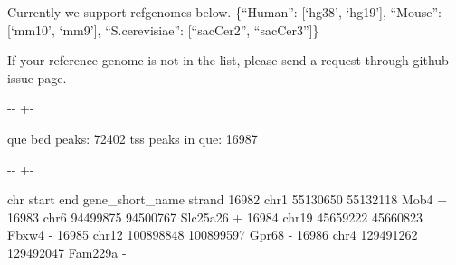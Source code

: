 \documentclass[letterpaper,10pt,english]{sphinxmanual}
\newlength\nbsphinxcodecellspacing
\begin{document}
Currently we support refgenomes below. \{“Human”: {[}‘hg38’, ‘hg19’{]}, “Mouse”: {[}‘mm10’, ‘mm9’{]}, “S.cerevisiae”: {[}“sacCer2”, “sacCer3”{]}\}

If your reference genome is not in the list, please send a request through github issue page.

{
\begin{sphinxVerbatim}[commandchars=\\\{\}]
\llap{\color{nbsphinxin}[5]:\,\hspace{\fboxrule}\hspace{\fboxsep}}
     


\end{sphinxVerbatim}
}

{

\kern-\sphinxverbatimsmallskipamount\kern-\baselineskip
\kern+\FrameHeightAdjust\kern-\fboxrule
\vspace{\nbsphinxcodecellspacing}

\begin{sphinxVerbatim}[commandchars=\\\{\}]
que bed peaks: 72402
tss peaks in que: 16987
\end{sphinxVerbatim}
}

{

\kern-\sphinxverbatimsmallskipamount\kern-\baselineskip
\kern+\FrameHeightAdjust\kern-\fboxrule
\vspace{\nbsphinxcodecellspacing}

\begin{sphinxVerbatim}[commandchars=\\\{\}]
\llap{\color{nbsphinxout}[5]:\,\hspace{\fboxrule}\hspace{\fboxsep}}         chr      start        end gene\_short\_name strand
16982   chr1   55130650   55132118            Mob4      +
16983   chr6   94499875   94500767        Slc25a26      +
16984  chr19   45659222   45660823           Fbxw4      -
16985  chr12  100898848  100899597           Gpr68      -
16986   chr4  129491262  129492047         Fam229a      -
\end{sphinxVerbatim}
}
\end{document}
